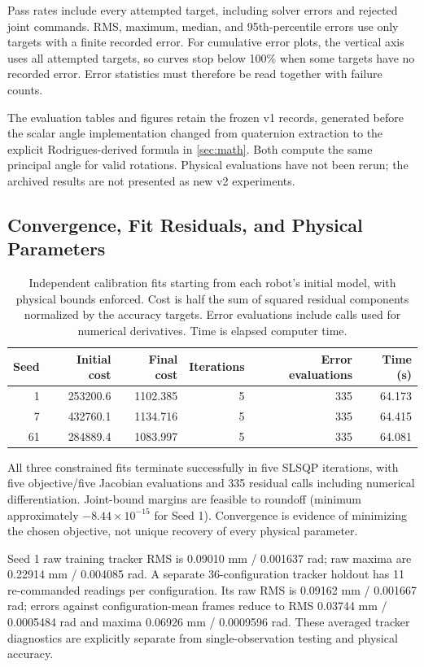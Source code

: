 \documentclass[11pt,letterpaper]{article}
\begin{document}
Pass rates include every attempted target, including solver errors and rejected joint commands. RMS, maximum, median, and 95th-percentile errors use only targets with a finite recorded error. For cumulative error plots, the vertical axis uses all attempted targets, so curves stop below 100\% when some targets have no recorded error. Error statistics must therefore be read together with failure counts.

The evaluation tables and figures retain the frozen v1 records, generated before the scalar angle implementation changed from quaternion extraction to the explicit Rodrigues-derived formula in \cref{sec:math}. Both compute the same principal angle for valid rotations. Physical evaluations have not been rerun; the archived results are not presented as new v2 experiments.

\subsection{Convergence, Fit Residuals, and Physical Parameters}
\begin{table}[!htbp]\centering\small
\caption{Independent calibration fits starting from each robot's initial model, with physical bounds enforced. Cost is half the sum of squared residual components normalized by the accuracy targets. Error evaluations include calls used for numerical derivatives. Time is elapsed computer time.}\label{tab:fits}
\begin{tabular}{@{}rrrrrr@{}}\toprule
Seed & Initial cost & Final cost & Iterations & Error evaluations & Time (s)\\\midrule
1 & 253200.6 & 1102.385 & 5 & 335 & 64.173\\
7 & 432760.1 & 1134.716 & 5 & 335 & 64.415\\
61 & 284889.4 & 1083.997 & 5 & 335 & 64.081\\
\bottomrule\end{tabular}
\end{table}
All three constrained fits terminate successfully in five SLSQP iterations, with five objective/five Jacobian evaluations and 335 residual calls including numerical differentiation. Joint-bound margins are feasible to roundoff (minimum approximately $-8.44\times10^{-15}$ for Seed 1). Convergence is evidence of minimizing the chosen objective, not unique recovery of every physical parameter.

Seed 1 raw training tracker RMS is 0.09010 mm / 0.001637 rad; raw maxima are 0.22914 mm / 0.004085 rad. A separate 36-configuration tracker holdout has 11 re-commanded readings per configuration. Its raw RMS is 0.09162 mm / 0.001667 rad; errors against configuration-mean frames reduce to RMS 0.03744 mm / 0.0005484 rad and maxima 0.06926 mm / 0.0009596 rad. These averaged tracker diagnostics are explicitly separate from single-observation testing and physical accuracy.
\end{document}
